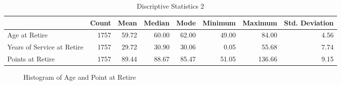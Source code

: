 \documentclass[12pt,letterpaper]{article}
\begin{document}
\begin{table}[htbp]
	\centering
	\scriptsize
	\caption{Discriptive Statistics 2}
	\begin{tabular}{lrrrrrrr}
		\toprule
		& Count & Mean  & Median & Mode  & Minimum & Maximum & Std. Deviation \\
		\midrule
		\multicolumn{1}{l}{Age at Retire} & 1757  & 59.72 & 60.00 & 62.00 & 49.00 & 84.00 & 4.56 \\
		\multicolumn{1}{l}{Years of Service at Retire} & 1757  & 29.72 & 30.90 & 30.06 & 0.05  & 55.68 & 7.74 \\
		\multicolumn{1}{l}{Points at Retire} & 1757  & 89.44 & 88.67 & 85.47 & 51.05 & 136.66 & 9.15 \\
		\bottomrule
	\end{tabular}%
	\label{tab:descrip2}%
\end{table}%

\begin{figure}[h!]
	\centering
	\caption{Histogram of Age and Point at Retire}
	\label{fig:hist}
\end{figure}
\end{document}
